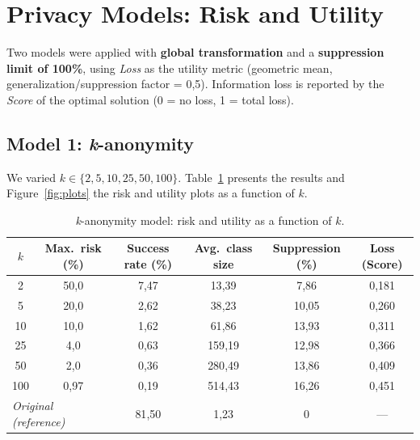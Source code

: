 \documentclass[10pt,a4paper]{article}
\begin{document}
\section{Privacy Models: Risk and Utility}
Two models were applied with \textbf{global transformation} and a \textbf{suppression limit of 100\%}, using
\textit{Loss} as the utility metric (geometric mean, generalization/suppression factor = 0{,}5). Information
loss is reported by the \textit{Score} of the optimal solution (0 = no loss, 1 = total loss).

\subsection{Model 1: \textit{k}-anonymity}
We varied $k \in \{2,5,10,25,50,100\}$. Table~\ref{tab:m1} presents the results and Figure~\ref{fig:plots} the
risk and utility plots as a function of $k$.

\begin{table}[h]
\centering\footnotesize
\begin{tabular}{c c c c c c}
\toprule
$k$ & \textbf{Max.\ risk (\%)} & \textbf{Success rate (\%)} & \textbf{Avg.\ class size} & \textbf{Suppression (\%)} & \textbf{Loss (Score)} \\
\midrule
2   & 50{,}0  & 7{,}47 & 13{,}39  & 7{,}86  & 0{,}181 \\
5   & 20{,}0  & 2{,}62 & 38{,}23  & 10{,}05 & 0{,}260 \\
10  & 10{,}0  & 1{,}62 & 61{,}86  & 13{,}93 & 0{,}311 \\
25  & 4{,}0   & 0{,}63 & 159{,}19 & 12{,}98 & 0{,}366 \\
50  & 2{,}0   & 0{,}36 & 280{,}49 & 13{,}86 & 0{,}409 \\
100 & 0{,}97  & 0{,}19 & 514{,}43 & 16{,}26 & 0{,}451 \\
\midrule
\multicolumn{2}{l}{\textit{Original (reference)}} & 81{,}50 & 1{,}23 & 0 & --- \\
\bottomrule
\end{tabular}
\caption{\textit{k}-anonymity model: risk and utility as a function of $k$.}
\label{tab:m1}
\end{table}
\end{document}
